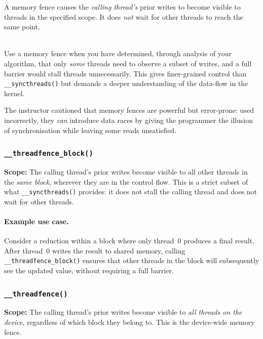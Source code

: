 A memory fence causes the \emph{calling thread's} prior writes to become
visible to threads in the specified scope. It does \emph{not} wait for other
threads to reach the same point.

\begin{ppkey}
  \\Use a memory fence when you have determined, through analysis of your
  algorithm, that only \emph{some} threads need to observe a subset of writes,
  and a full barrier would stall threads unnecessarily. This gives finer-grained
  control than \texttt{\_\_syncthreads()} but demands a deeper understanding of
  the data-flow in the kernel.
\end{ppkey}

The instructor cautioned that memory fences are powerful but error-prone: used
incorrectly, they \emph{can} introduce data races by giving the programmer the
illusion of synchronisation while leaving some reads unsatisfied.

\subsubsection{\texttt{\_\_threadfence\_block()}}


\textbf{Scope:} The calling thread's prior writes become visible to all other
threads in the \emph{same block}, wherever they are in the control flow.
This is a strict subset of what \texttt{\_\_syncthreads()} provides: it does
not stall the calling thread and does not wait for other threads.

\paragraph{Example use case.}
Consider a reduction within a block where only thread~0 produces a final
result. After thread~0 writes the result to shared memory, calling
\texttt{\_\_threadfence\_block()} ensures that other threads in the block will
subsequently see the updated value, without requiring a full barrier.

\subsubsection{\texttt{\_\_threadfence()}}



\textbf{Scope:} The calling thread's prior writes become visible to \emph{all
threads on the device}, regardless of which block they belong to. This is the
device-wide memory fence.

